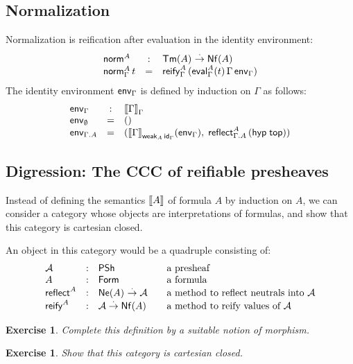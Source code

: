 \documentclass[a4paper]{article}
\newtheorem{exercise}[theorem]{Exercise}
\begin{document}
\subsection{Normalization}

Normalization is reification after evaluation in the identity
environment:
\[
\begin{array}{lcl}
\tnorm^A & : & \Tm A \todot \Nf A \\
\norm[\Gamma] A t & = & \reify[\Gamma]A {(\eval[\Gamma] A t \,\Gamma\, \env[\Gamma])}
\end{array}
\]
The identity environment $\env[\Gamma]$ is defined by induction on
$\Gamma$ as follows:
\[
\begin{array}{lcl}
  \env[\Gamma] & : & \den \Gamma _\Gamma \\
  \env[\cempty] & = & () \\
  \env[\Gamma.A] & = & (\den\Gamma_{\weak[A] \id[\Gamma]}(\env[\Gamma]), \;
                          \reflect[\Gamma.A] A {(\hyp \ttop)})
\end{array}
\]

\subsection{Digression: The CCC of reifiable presheaves}

Instead of defining the semantics $\den A$ of formula $A$ by induction
on $A$, we can consider a category whose objects are interpretations
of formulas, and show that this category is cartesian closed.

An object in this category would be a quadruple consisting of:
\[
\begin{array}{lll@{\qquad}l}
  \A & : & \PSh  & \mbox{a presheaf} \\
  A  & : & \Form & \mbox{a formula} \\
  \treflect^A & : & \Ne A \todot \A
    & \mbox{a method to reflect neutrals into $\A$} \\
  \treify^A & : & \A \todot \Nf A
    & \mbox{a method to reify values of $\A$} \\
\end{array}
\]
\begin{exercise}
  Complete this definition by a suitable notion of morphism.
\end{exercise}
\begin{exercise}
  Show that this category is cartesian closed.
\end{exercise}


\end{document}
